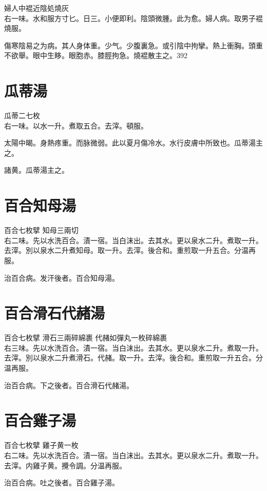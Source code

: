 婦人中裩近陰処燒灰\\
右一味。水和服方寸匕。日三。小便即利。陰頭微腫。此为愈。婦人病。取男子裩燒服。

傷寒陰易之为病。其人身体重。少气。少腹裏急。或引陰中拘攣。熱上衝胸。頭重不欲舉。眼中生眵。{\khaai 眼胞赤。}膝脛拘急。燒裩散主之。392

\section{瓜蒂湯}

瓜蒂{\scriptsize 二七枚}\\
右一味。以水一升。煮取五合。去滓。頓服。

太陽中暍。身熱疼重。而脉微弱。此以夏月傷冷水。水行皮膚中所致也。瓜蒂湯主之。

諸黄。瓜蒂湯主之。

\section{百合知母湯}

百合{\scriptsize 七枚擘} 知母{\scriptsize 三兩切}\\
右二味。先以水洗百合。漬一宿。当白沫出。去其水。更以泉水二升。煮取一升。去滓。別以泉水二升煮知母。取一升。去滓。後合和。重煎取一升五合。分温再服。

治百合病。发汗後者。百合知母湯。

\section{百合滑石代赭湯}

百合{\scriptsize 七枚擘} 滑石{\scriptsize 三兩碎綿裹} 代赭{\scriptsize 如彈丸一枚碎綿裹}\\
右三味。先以水洗百合。漬一宿。当白沫出。去其水。更以泉水二升。煮取一升。去滓。別以泉水二升煮滑石。代赭。取一升。去滓。後合和。重煎取一升五合。分温再服。

治百合病。下之後者。百合滑石代赭湯。

\section{百合雞子湯}

百合{\scriptsize 七枚擘} 雞子黄{\scriptsize 一枚}\\
右二味。先以水洗百合。漬一宿。当白沫出。去其水。更以泉水二升。煮取一升。去滓。内雞子黄。攪令調。分温再服。

治百合病。吐之後者。百合雞子湯。

